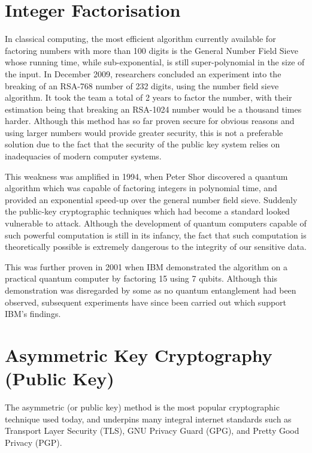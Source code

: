 \documentclass[runningheads,a4paper]{llncs}
\begin{document}
\section{Integer Factorisation}

In classical computing, the most efficient algorithm currently available for factoring numbers with more than 100 digits is the General Number Field Sieve whose running time, while sub-exponential, is still super-polynomial in the size of the input. In December 2009, researchers concluded an experiment into the breaking of an RSA-768 number of 232 digits, using the number field sieve algorithm. It took the team a total of 2 years to factor the number, with their estimation being that breaking an RSA-1024 number would be a thousand times harder\cite{Kleinjung:2010:FRM:1881412.1881436}. Although this method has so far proven secure for obvious reasons and using larger numbers would provide greater security, this is not a preferable solution due to the fact that the security of the public key system relies on inadequacies of modern computer systems. 

This weakness was amplified in 1994, when Peter Shor discovered a quantum algorithm which was capable of factoring integers in polynomial time\cite{Shor:1994fk}, and provided an exponential speed-up over the general number field sieve. Suddenly the public-key cryptographic techniques which had become a standard looked vulnerable to attack. Although the development of quantum computers capable of such powerful computation is still in its infancy,   the fact that such computation is theoretically possible is extremely dangerous to the integrity of our sensitive data.

This was further proven in 2001 when IBM demonstrated the algorithm on a practical quantum computer by factoring 15 using 7 qubits\cite{Vandersypen:2001fk}. Although this demonstration was disregarded by some as no quantum entanglement had been observed, subsequent experiments have since been carried out which support IBM's findings\cite{Lu:2007uq}.

\section{Asymmetric Key Cryptography (Public Key)} 

The asymmetric (or public key) method is the most popular cryptographic technique used today, and underpins many integral internet standards such as Transport Layer Security (TLS), GNU Privacy Guard (GPG), and Pretty Good Privacy (PGP).
\end{document}
